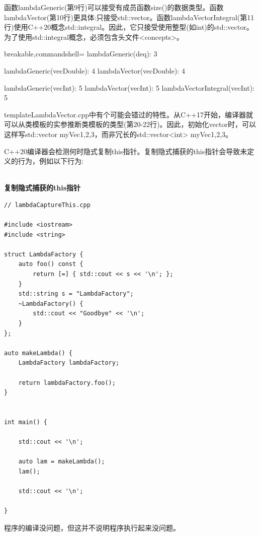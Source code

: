 函数lambdaGeneric(第9行)可以接受有成员函数size()的数据类型。函数lambdaVector(第10行)更具体:只接受std::vector。函数lambdaVectorIntegral(第11行)使用C++20概念std::integral。因此，它只接受使用整型(如int)的std::vector。为了使用std::integral概念，必须包含头文件<concepts>。

\begin{tcblisting}{breakable,commandshell={}}
lambdaGeneric(deq): 3

lambdaGeneric(vecDouble): 4
lambdaVector(vecDouble): 4

lambdaGeneric(vecInt): 5
lambdaVector(vecInt): 5
lambdaVectorIntegral(vecInt): 5
\end{tcblisting}

\begin{tcolorbox}[breakable,enhanced jigsaw,colback=mygreen!5!white,colframe=mygreen!75!black,title={类模板参数的推导}]
templateLambdaVector.cpp中有个可能会错过的特性。从C++17开始，编译器就可以从类模板的实参推断类模板的类型(第20-22行)。因此，初始化vector时，可以这样写std::vector myVec{1,2,3}，而非冗长的std::vector<int> myVec{1,2,3}。
\end{tcolorbox}


C++20编译器会检测何时隐式复制this指针。复制隐式捕获的this指针会导致未定义的行为，例如以下行为:

\hspace*{\fill} \\ %
\noindent
\textbf{复制隐式捕获的this指针}
\begin{lstlisting}[style=styleCXX]
// lambdaCaptureThis.cpp

#include <iostream>
#include <string>

struct LambdaFactory {
	auto foo() const {
		return [=] { std::cout << s << '\n'; };
	}
	std::string s = "LambdaFactory";
	~LambdaFactory() {
		std::cout << "Goodbye" << '\n';
	}
};

auto makeLambda() {
	LambdaFactory lambdaFactory; 
	
	return lambdaFactory.foo();
}


int main() {

	std::cout << '\n';
	
	auto lam = makeLambda();
	lam();
	
	std::cout << '\n';

}
\end{lstlisting}

程序的编译没问题，但这并不说明程序执行起来没问题。

